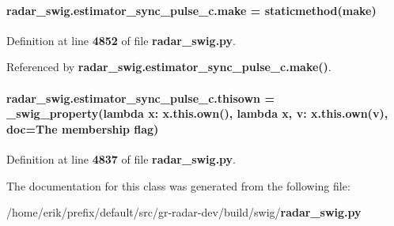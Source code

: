 \paragraph[{make}]{\setlength{\rightskip}{0pt plus 5cm}radar\+\_\+swig.\+estimator\+\_\+sync\+\_\+pulse\+\_\+c.\+make = staticmethod(make)\hspace{0.3cm}{\ttfamily [static]}}\label{classradar__swig_1_1estimator__sync__pulse__c_a2f42db294a2a916539c3b5daecb91b70}


Definition at line {\bf 4852} of file {\bf radar\+\_\+swig.\+py}.



Referenced by {\bf radar\+\_\+swig.\+estimator\+\_\+sync\+\_\+pulse\+\_\+c.\+make()}.

\paragraph[{thisown}]{\setlength{\rightskip}{0pt plus 5cm}radar\+\_\+swig.\+estimator\+\_\+sync\+\_\+pulse\+\_\+c.\+thisown = {\bf \+\_\+swig\+\_\+property}(lambda x\+: x.\+this.\+own(), lambda {\bf x}, v\+: x.\+this.\+own(v), doc=\textquotesingle{}The membership flag\textquotesingle{})\hspace{0.3cm}{\ttfamily [static]}}\label{classradar__swig_1_1estimator__sync__pulse__c_ae8ec2125d95596e4c12bea37a223616e}


Definition at line {\bf 4837} of file {\bf radar\+\_\+swig.\+py}.



The documentation for this class was generated from the following file\+:\begin{DoxyCompactItemize}
\item 
/home/erik/prefix/default/src/gr-\/radar-\/dev/build/swig/{\bf radar\+\_\+swig.\+py}\end{DoxyCompactItemize}
